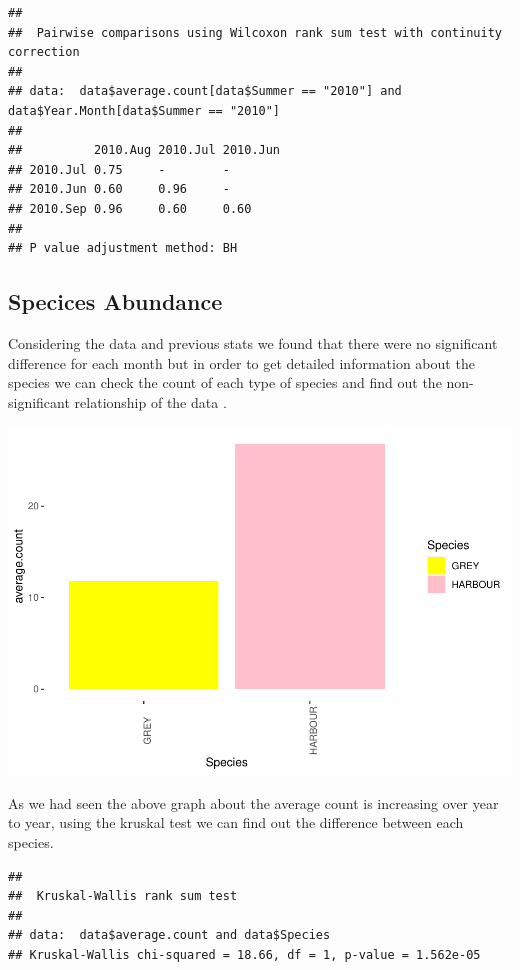 \documentclass[
]{article}
\begin{document}
\begin{verbatim}
## 
##  Pairwise comparisons using Wilcoxon rank sum test with continuity correction 
## 
## data:  data$average.count[data$Summer == "2010"] and data$Year.Month[data$Summer == "2010"] 
## 
##          2010.Aug 2010.Jul 2010.Jun
## 2010.Jul 0.75     -        -       
## 2010.Jun 0.60     0.96     -       
## 2010.Sep 0.96     0.60     0.60    
## 
## P value adjustment method: BH
\end{verbatim}

\hypertarget{specices-abundance}{%
\subsection{Specices Abundance}\label{specices-abundance}}

Considering the data and previous stats we found that there were no
significant difference for each month but in order to get detailed
information about the species we can check the count of each type of
species and find out the non-significant relationship of the data .

\includegraphics{Statistical-analysis-in-RStudio_files/figure-latex/unnamed-chunk-21-1.pdf}

As we had seen the above graph about the average count is increasing
over year to year, using the kruskal test we can find out the difference
between each species.

\begin{verbatim}
## 
##  Kruskal-Wallis rank sum test
## 
## data:  data$average.count and data$Species
## Kruskal-Wallis chi-squared = 18.66, df = 1, p-value = 1.562e-05
\end{verbatim}
\end{document}

